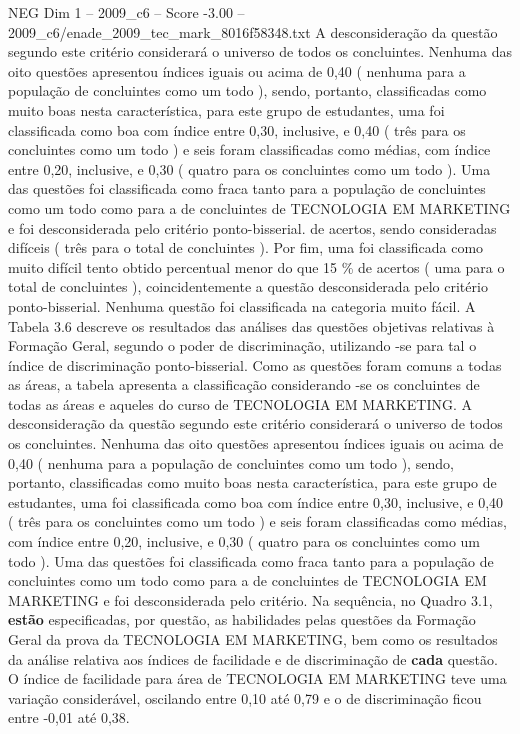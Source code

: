 \begin{textsample}{NEG Dim 1 – 2009\_c6 – Score -3.00 – 2009\_c6/enade\_2009\_tec\_mark\_8016f58348.txt}
A desconsideração da questão segundo este critério considerará o universo de todos os concluintes.
Nenhuma das oito questões apresentou índices iguais ou acima de 0,40 ( nenhuma para a população de concluintes como um todo ), sendo, portanto, classificadas como muito boas nesta característica, para este grupo de estudantes, uma foi classificada como boa com índice entre 0,30, inclusive, e 0,40 ( três para os concluintes como um todo ) e seis foram classificadas como médias, com índice entre 0,20, inclusive, e 0,30 ( quatro para os concluintes como um todo ).
Uma das questões foi classificada como fraca tanto para a população de concluintes como um todo como para a de concluintes de TECNOLOGIA EM MARKETING e foi desconsiderada pelo critério ponto-bisserial. de acertos, sendo consideradas difíceis ( três para o total de concluintes ).
Por fim, uma foi classificada como muito difícil tento obtido percentual menor do que 15 \% de acertos ( uma para o total de concluintes ), coincidentemente a questão desconsiderada pelo critério ponto-bisserial.
Nenhuma questão foi classificada na categoria muito fácil.
A Tabela 3.6 descreve os resultados das análises das questões objetivas relativas à Formação Geral, segundo o poder de discriminação, utilizando -se para tal o índice de discriminação ponto-bisserial.
Como as questões foram comuns a todas as áreas, a tabela apresenta a classificação considerando -se os concluintes de todas as áreas e aqueles do curso de TECNOLOGIA EM MARKETING.
A desconsideração da questão segundo este critério considerará o universo de todos os concluintes.
Nenhuma das oito questões apresentou índices iguais ou acima de 0,40 ( nenhuma para a população de concluintes como um todo ), sendo, portanto, classificadas como muito boas nesta característica, para este grupo de estudantes, uma foi classificada como boa com índice entre 0,30, inclusive, e 0,40 ( três para os concluintes como um todo ) e seis foram classificadas como médias, com índice entre 0,20, inclusive, e 0,30 ( quatro para os concluintes como um todo ).
Uma das questões foi classificada como fraca tanto para a população de concluintes como um todo como para a de concluintes de TECNOLOGIA EM MARKETING e foi desconsiderada pelo critério.
Na sequência, no Quadro 3.1, \textbf{estão} especificadas, por questão, as habilidades pelas questões da Formação Geral da prova da TECNOLOGIA EM MARKETING, bem como os resultados da análise relativa aos índices de facilidade e de discriminação de \textbf{cada} questão.
O índice de facilidade para área de TECNOLOGIA EM MARKETING teve uma variação considerável, oscilando entre 0,10 até 0,79 e o de discriminação ficou entre -0,01 até 0,38.

\end{textsample}
